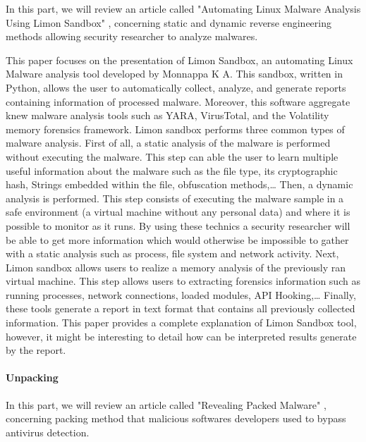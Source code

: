 In this part, we will review an article called "Automating Linux Malware Analysis Using
Limon Sandbox" \cite{paperLimon}, concerning static and dynamic reverse engineering methods allowing 
security researcher to analyze malwares.

This paper focuses on the presentation of Limon Sandbox, an automating Linux Malware
analysis tool developed by Monnappa K A. This sandbox, written in Python, allows the user
to automatically collect, analyze, and generate reports containing information of processed
malware. Moreover, this software aggregate knew malware analysis tools such as YARA, 
VirusTotal, and the Volatility memory forensics framework. Limon sandbox performs three 
common types of malware analysis. First of all, a static analysis of the malware is
performed without executing the malware. This step can able the user to learn multiple
useful information about the malware such as the file type, its cryptographic hash, Strings
embedded within the file, obfuscation methods,… Then, a dynamic analysis is performed.
This step consists of executing the malware sample in a safe environment (a virtual machine
without any personal data) and where it is possible to monitor as it runs. By using these
technics a security researcher will be able to get more information which would otherwise
be  impossible to gather with a static analysis such as process, file system and network
activity. Next, Limon sandbox allows users to realize a memory analysis of the previously
ran virtual machine. This step allows users to extracting forensics information such as 
running processes, network connections, loaded modules, API Hooking,…
Finally, these tools generate a report in text format that contains all previously
collected information. This paper provides a complete explanation of Limon Sandbox tool,
however, it might be interesting to detail how can be interpreted results generate by the
report.


\paragraph{Unpacking} %

In this part, we will review an article called "Revealing Packed Malware" \cite{paperPackedMalware}, concerning 
packing method that malicious softwares developers used to bypass antivirus detection. 

